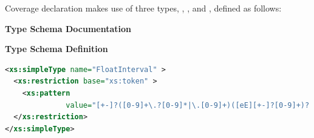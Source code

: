 \documentclass[11pt,a4paper]{ivoa}
\begin{document}


Coverage declaration makes use of three types, ,
, and , defined as
follows:


\begin{generated}
\begingroup
        \renewcommand*\descriptionlabel[1]{%
        \hbox to 5.5em{\emph{#1}\hfil}}\vspace{2ex}\noindent\textbf{ Type Schema Documentation}



\vspace{1ex}\noindent\textbf{ Type Schema Definition}

\begin{lstlisting}[language=XML,basicstyle=\footnotesize]
<xs:simpleType name="FloatInterval" >
  <xs:restriction base="xs:token" >
    <xs:pattern
              value="[+-]?([0-9]+\.?[0-9]*|\.[0-9]+)([eE][+-]?[0-9]+)? [+-]?([0-9]+\.?[0-9]*|\.[0-9]+)([eE][+-]?[0-9]+)?" />
  </xs:restriction>
</xs:simpleType>
\end{lstlisting}\endgroup
\end{generated}

\end{document}
